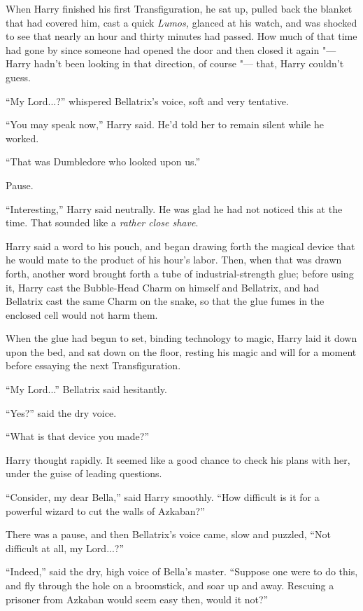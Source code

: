 When Harry finished his first Transfiguration, he sat up, pulled back
the blanket that had covered him, cast a quick \emph{Lumos,} glanced at
his watch, and was shocked to see that nearly an hour and thirty minutes
had passed. How much of that time had gone by since someone had opened
the door and then closed it again "--- Harry hadn't been looking in that
direction, of course "--- that, Harry couldn't guess.

``My Lord...?'' whispered Bellatrix's voice, soft and very
tentative.

``You may speak now,'' Harry said. He'd told her to remain silent while
he worked.

``That was Dumbledore who looked upon us.''

Pause.

``Interesting,'' Harry said neutrally. He was glad he had not noticed
this at the time. That sounded like a \emph{rather close shave}.

Harry said a word to his pouch, and began drawing forth the magical
device that he would mate to the product of his hour's labor. Then, when
that was drawn forth, another word brought forth a tube of
industrial-strength glue; before using it, Harry cast the Bubble-Head
Charm on himself and Bellatrix, and had Bellatrix cast the same Charm on
the snake, so that the glue fumes in the enclosed cell would not harm
them.

When the glue had begun to set, binding technology to magic, Harry laid
it down upon the bed, and sat down on the floor, resting his magic and
will for a moment before essaying the next Transfiguration.

``My Lord...'' Bellatrix said hesitantly.

``Yes?'' said the dry voice.

``What is that device you made?''

Harry thought rapidly. It seemed like a good chance to check his plans
with her, under the guise of leading questions.

``Consider, my dear Bella,'' said Harry smoothly. ``How difficult is it
for a powerful wizard to cut the walls of Azkaban?''

There was a pause, and then Bellatrix's voice came, slow and puzzled,
``Not difficult at all, my Lord...?''

``Indeed,'' said the dry, high voice of Bella's master. ``Suppose one
were to do this, and fly through the hole on a broomstick, and soar up
and away. Rescuing a prisoner from Azkaban would seem easy then, would
it not?''

